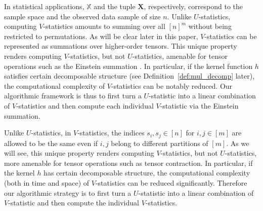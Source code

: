 \documentclass[twoside,11pt]{article}
\newcommand{\Lin}[1]{{\color{purple}{Lin: #1}}}
\newcommand{\Zhang}[1]{{\color{blue}{Zhang: #1}}}
\newcommand{\sper}{\sigma}
\newcommand{\ustat}{\mathbb{U}}
\newcommand{\vstat}{\mathbb{V}}
\newcommand{\ustatp}[2]{\ustat(#1,#2)}
\newcommand{\vstatp}[2]{\vstat(#1,#2)}
\def\bbX{\mathbb{X}}
\begin{document}
In statistical applications, $\bbX$ and the tuple $\bm{X}$, respectively, correspond to the sample space and the observed data sample of size $n$. Unlike $U$-statistics, computing $V$-statistics amounts to summing over all $[n]^{m}$ without being restricted to permutations. As will be clear later in this paper, $V$-statistics can be represented as summations over higher-order tensors. This unique property renders computing $V$-statistics, but not $U$-statistics, amenable for tensor operations such as the Einstein summation \citep{einstein1916grundlage}. In particular, if the kernel function $h$ satisfies certain decomposable structure (see Definition~\ref{def:mul_decomp} later), the computational complexity of $V$-statistics can be notably reduced.
Our algorithmic framework is thus to first turn a $U$-statistic into a linear combination of $V$-statistics and then compute each individual $V$-statistic via the Einstein summation.

\iffalse
Unlike $U$-statistics, in $V$-statistics, the indices $s_{i}, s_{j} \in [n]$ for $i, j \in [m]$ are allowed to be the same even if $i, j$ belong to different partitions of $[m]$. As we will see, this unique property renders computing $V$-statistics, but not $U$-statistics, more amenable for tensor operations such as tensor contraction. In particular, if the kernel $h$ has certain decomposable structure, the computational complexity (both in time and space) of $V$-statistics can be reduced significantly. Therefore our algorithmic strategy is to first turn a $U$-statistic into a linear combination of $V$-statistic and then compute the individual $V$-statistics.
\end{document}
